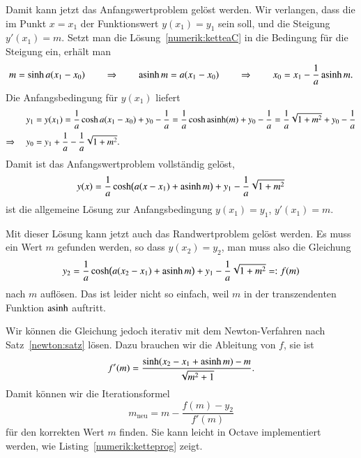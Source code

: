 \begin{loesung}
Damit kann jetzt das Anfangswertproblem gelöst werden.
Wir verlangen, dass die im Punkt $x=x_1$ der Funktionswert 
$y(x_1)=y_1$ sein soll, und die Steigung $y'(x_1)=m$.
Setzt man die Lösung~\eqref{numerik:ketteaC} in die Bedingung
für die Steigung ein, erhält man
\[
m=\sinh a(x_1-x_0)
\qquad\Rightarrow\qquad
\operatorname{asinh} m =a(x_1-x_0)
\qquad\Rightarrow\qquad
x_0=x_1-\frac1a\operatorname{asinh} m.
\]
Die Anfangsbedingung für $y(x_1)$ liefert
\begin{align*}
y_1
&=
y(x_1)
=
\frac1a\cosh a(x_1-x_0) + y_0 - \frac1a
=
\frac1a\cosh \operatorname{asinh}(m)+y_0-\frac1a
=
\frac1a\sqrt{1+m^2}+y_0-\frac1a
\\
\Rightarrow\quad
y_0
&= 
y_1+\frac1a-\frac1a\sqrt{1+m^2}.
\end{align*}
Damit ist das Anfangswertproblem vollständig gelöst, 
\begin{equation}
y(x)
=
\frac1a\cosh \bigl(a(x-x_1) + \operatorname{asinh} m\bigr)
+ y_1 - \frac1a\sqrt{1+m^2}
\end{equation}
ist die allgemeine Lösung zur Anfangsbedingung $y(x_1)=y_1$, $y'(x_1)=m$.

Mit dieser Lösung kann jetzt auch das Randwertproblem gelöst werden.
Es muss ein Wert $m$ gefunden werden, so dass $y(x_2)=y_2$,
man muss also die Gleichung
\[
y_2
=
\frac1a\cosh \bigl(a(x_2-x_1)+\operatorname{asinh} m\bigr) + y_1 - \frac1a\sqrt{1+m^2}
=:
f(m)
\]
nach $m$ auflösen.
Das ist leider nicht so einfach, weil $m$ in der transzendenten Funktion
$\operatorname{asinh}$ auftritt.

Wir können die Gleichung jedoch iterativ mit dem Newton-Verfahren
nach Satz~\ref{newton:satz} lösen.
Dazu brauchen wir die Ableitung von $f$, sie ist
\[
f'(m)
=
\frac{ \sinh (x_2-x_1+\operatorname{asinh} m) -m}{\sqrt{m^2+1}}.
\]
Damit können wir die Iterationsformel
\[
m_{\text{neu}} = m - \frac{f(m) - y_2}{f'(m)}
\]
für den korrekten Wert $m$ finden.
Sie kann leicht in Octave implementiert werden, wie Listing~\ref{numerik:ketteprog} zeigt.
%
%


\end{loesung}
